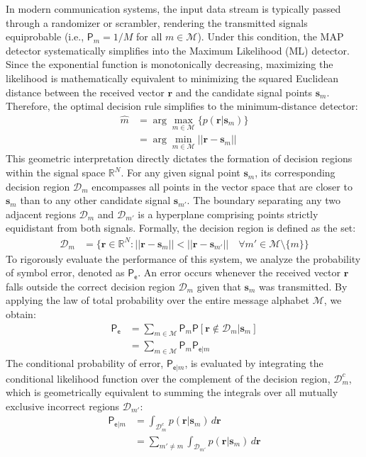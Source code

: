 In modern communication systems, the input data stream is typically passed through a randomizer or scrambler, rendering the transmitted signals equiprobable (i.e., $\mathsf{P}_m = 1/M$ for all $m \in \mathcal{M}$). Under this condition, the MAP detector systematically simplifies into the Maximum Likelihood (ML) detector. Since the exponential function is monotonically decreasing, maximizing the likelihood is mathematically equivalent to minimizing the squared Euclidean distance between the received vector $\bm{r}$ and the candidate signal points $\bm{s}_m$. Therefore, the optimal decision rule simplifies to the minimum-distance detector:
\begin{align*}
    \hat{m} &= \arg\max_{m \in \mathcal{M}} \{ p(\bm{r}|\bm{s}_m) \} \\
            &= \arg\min_{m \in \mathcal{M}} ||\bm{r} - \bm{s}_m||
\end{align*}
This geometric interpretation directly dictates the formation of decision regions within the signal space $\mathbb{R}^N$. For any given signal point $\bm{s}_m$, its corresponding decision region $\mathcal{D}_m$ encompasses all points in the vector space that are closer to $\bm{s}_m$ than to any other candidate signal $\bm{s}_{m'}$. The boundary separating any two adjacent regions $\mathcal{D}_m$ and $\mathcal{D}_{m'}$ is a hyperplane comprising points strictly equidistant from both signals. Formally, the decision region is defined as the set:
\begin{align*}
    \mathcal{D}_m &= \{ \bm{r} \in \mathbb{R}^N : ||\bm{r} - \bm{s}_m|| < ||\bm{r} - \bm{s}_{m'}|| \quad \forall m' \in \mathcal{M} \setminus \{m\} \}
\end{align*}
To rigorously evaluate the performance of this system, we analyze the probability of symbol error, denoted as $\mathsf{P}_{\mathsf{e}}$. An error occurs whenever the received vector $\bm{r}$ falls outside the correct decision region $\mathcal{D}_m$ given that $\bm{s}_m$ was transmitted. By applying the law of total probability over the entire message alphabet $\mathcal{M}$, we obtain:
\begin{align*}
    \mathsf{P}_{\mathsf{e}} &= \sum_{m \in \mathcal{M}} \mathsf{P}_m \mathsf{P}[\bm{r} \notin \mathcal{D}_m | \bm{s}_m] \\
                            &= \sum_{m \in \mathcal{M}} \mathsf{P}_m \mathsf{P}_{\mathsf{e}|m}
\end{align*}
The conditional probability of error, $\mathsf{P}_{\mathsf{e}|m}$, is evaluated by integrating the conditional likelihood function over the complement of the decision region, $\mathcal{D}_m^c$, which is geometrically equivalent to summing the integrals over all mutually exclusive incorrect regions $\mathcal{D}_{m'}$:
\begin{align*}
    \mathsf{P}_{\mathsf{e}|m} &= \int_{\mathcal{D}_m^c} p(\bm{r}|\bm{s}_m) \, d\bm{r} \\
                              &= \sum_{m' \neq m} \int_{\mathcal{D}_{m'}} p(\bm{r}|\bm{s}_m) \, d\bm{r}
\end{align*}


